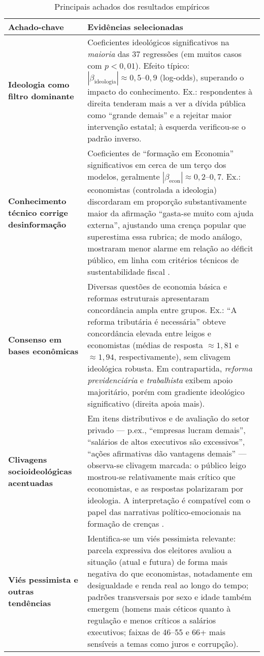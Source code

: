 \begin{table}[!htb]\centering\footnotesize
\caption{Principais achados dos resultados empíricos}\label{tab:achados}
\begin{tabular}{p{5.5cm} p{9.5cm}}
\toprule
\textbf{Achado-chave} & \textbf{Evidências selecionadas} \\
\midrule
\textbf{Ideologia como filtro dominante} & Coeficientes ideológicos significativos na \textit{maioria} das 37 regressões (em muitos casos com \(p<0{,}01\)). Efeito típico: \(|\beta_{\text{ideologia}}|\approx0{,}5\text{–}0{,}9\) (log-odds), superando o impacto do conhecimento. Ex.: respondentes à direita tenderam mais a ver a dívida pública como “grande demais” e a rejeitar maior intervenção estatal; à esquerda verificou-se o padrão inverso. \\
\textbf{Conhecimento técnico corrige desinformação} & Coeficientes de “formação em Economia” significativos em cerca de um terço dos modelos, geralmente \(|\beta_{\text{econ}}|\approx0{,}2\text{–}0{,}7\). Ex.: economistas (controlada a ideologia) discordaram em proporção substantivamente maior da afirmação “gasta-se muito com ajuda externa”, ajustando uma crença popular que superestima essa rubrica; de modo análogo, mostraram menor alarme em relação ao déficit público, em linha com critérios técnicos de sustentabilidade fiscal \cite{The_Myth_of_the_Rational_Voter}. \\
\textbf{Consenso em bases econômicas} & Diversas questões de economia básica e reformas estruturais apresentaram concordância ampla entre grupos. Ex.: “A reforma tributária é necessária” obteve concordância elevada entre leigos e economistas (médias de resposta \(\approx1{,}81\) e \(\approx1{,}94\), respectivamente), sem clivagem ideológica robusta. Em contrapartida, \textit{reforma previdenciária} e \textit{trabalhista} exibem apoio majoritário, porém com gradiente ideológico significativo (direita apoia mais). \\
\textbf{Clivagens socioideológicas acentuadas} & Em itens distributivos e de avaliação do setor privado — p.ex., “empresas lucram demais”, “salários de altos executivos são excessivos”, “ações afirmativas dão vantagens demais” — observa-se clivagem marcada: o público leigo mostrou-se relativamente mais crítico que economistas, e as respostas polarizaram por ideologia. A interpretação é compatível com o papel das narrativas político-emocionais na formação de crenças \cite{westen2007political}. \\
\textbf{Viés pessimista e outras tendências} & Identifica-se um viés pessimista relevante: parcela expressiva dos eleitores avaliou a situação (atual e futura) de forma mais negativa do que economistas, notadamente em desigualdade e renda real ao longo do tempo; padrões transversais por sexo e idade também emergem (homens mais céticos quanto à regulação e menos críticos a salários executivos; faixas de 46–55 e 66+ mais sensíveis a temas como juros e corrupção). \\
\bottomrule
\end{tabular}
\end{table}

